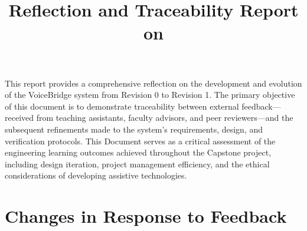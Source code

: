 \documentclass{article}
\title{Reflection and Traceability Report on \progname}
\author{\authname}
\date{}
\begin{document}
\maketitle

This report provides a comprehensive reflection on the development and evolution of the VoiceBridge system from Revision 0 to Revision 1. The primary objective of this document is to demonstrate traceability between external feedback—received from teaching assistants, faculty advisors, and peer reviewers—and the subsequent refinements made to the system's requirements, design, and verification protocols. This Document serves as a critical assessment of the engineering learning outcomes achieved throughout the Capstone project, including design iteration, project management efficiency, and the ethical considerations of developing assistive technologies.
\section{Changes in Response to Feedback}





\end{document}
